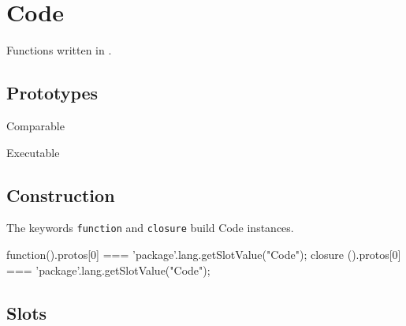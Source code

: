 
\section{Code}

Functions written in \us.

\subsection{Prototypes}

\begin{refObjects}
\item[Comparable]
\item[Executable]
\end{refObjects}

\subsection{Construction}

The keywords \lstinline|function| and \lstinline|closure| build Code
instances.

\begin{urbiassert}
function(){}.protos[0] === 'package'.lang.getSlotValue("Code");
closure (){}.protos[0] === 'package'.lang.getSlotValue("Code");
\end{urbiassert}

\subsection{Slots}

